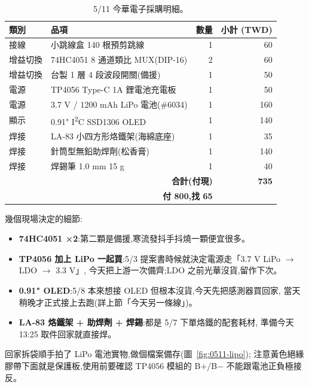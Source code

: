 \begin{table}[H]
  \centering
  \caption{5/11 今華電子採購明細。}
  \label{tab:0511-bom}
  \begin{tabular}{llrr}
    \toprule
    類別 & 品項 & 數量 & 小計 (TWD) \\
    \midrule
    接線     & 小跳線盒 140 根預剪跳線              & 1 & 60  \\
    增益切換 & 74HC4051 8 通道類比 MUX(DIP-16)     & 2 & 60  \\
    增益切換 & 台製 1 層 4 段波段開關(備援)         & 1 & 50  \\
    電源     & TP4056 Type-C 1A 鋰電池充電板         & 1 & 50  \\
    電源     & 3.7 V / 1200 mAh LiPo 電池(\#6034)    & 1 & 160 \\
    顯示     & 0.91" I\textsuperscript{2}C SSD1306 OLED & 1 & 140 \\
    焊接     & LA-83 小四方形烙鐵架(海綿底座)        & 1 & 35  \\
    焊接     & 針筒型無鉛助焊劑(松香膏)              & 1 & 140 \\
    焊接     & 焊錫筆 1.0 mm \texttimes{} 15 g       & 1 & 40  \\
    \midrule
    \multicolumn{3}{r}{\textbf{合計(付現)}} & \textbf{735} \\
    \multicolumn{3}{r}{\textbf{付 800,找 65}} & \\
    \bottomrule
  \end{tabular}
\end{table}

幾個現場決定的細節:

\begin{itemize}[leftmargin=2em,itemsep=0pt]
  \item \textbf{74HC4051 ×2}:第二顆是備援,寒流發抖手抖燒一顆便宜很多。
  \item \textbf{TP4056 加上 LiPo 一起買}:5/3 提案書時候就決定電源走「3.7 V LiPo \(\to\) LDO \(\to\) 3.3 V」,
        今天把上游一次備齊;LDO 之前光華沒貨,留作下次。
  \item \textbf{0.91" OLED}:5/8 本來想接 OLED 但根本沒貨,今天先把感測器買回家,
        當天稍晚才正式接上去跑(詳上節「今天另一條線」)。
  \item \textbf{LA-83 烙鐵架 + 助焊劑 + 焊錫}:都是 5/7 下單烙鐵的配套耗材,
        準備今天 13:25 取件回家就直接焊。
\end{itemize}

回家拆袋順手拍了 LiPo 電池實物,做個檔案備存(圖~\ref{fig:0511-lipo});
注意黃色絕緣膠帶下面就是保護板,使用前要確認 TP4056 模組的 B\(+\)/B\(-\) 不能跟電池正負極接反。

